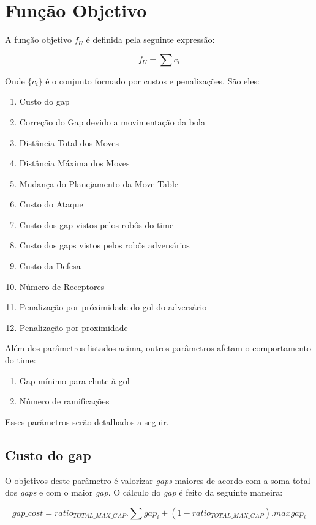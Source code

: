 \section{Função Objetivo}
A função objetivo $f_U$ é definida pela seguinte
expressão:

\begin{dmath}
  f_U = \sum c_i 
\end{dmath}

Onde $\lbrace c_i \rbrace$ é o conjunto formado
por custos e penalizações. São eles:
\begin{enumerate}
  \item Custo do gap
  \item Correção do Gap devido a movimentação da bola
  \item Distância Total dos Moves
  \item Distância Máxima dos Moves 
  \item Mudança do Planejamento da Move Table
  \item Custo do Ataque
  \item Custo dos gap vistos pelos robôs do time
  \item Custo dos gaps vistos pelos robôs adversários
  \item Custo da Defesa
  \item Número de Receptores
  \item Penalização por próximidade do gol do adversário
  \item Penalização por proximidade
\end{enumerate}

Além dos parâmetros listados acima, outros parâmetros
afetam o comportamento do time:
\begin{enumerate}
  \item Gap mínimo para chute à gol
  \item Número de ramificações
\end{enumerate}

Esses parâmetros serão detalhados a seguir.

\subsection{Custo do gap}\label{subsec:custo_gap}
O objetivos deste parâmetro é valorizar \textit{gaps} maiores
de acordo com a soma total dos \textit{gaps} e com o maior \textit{gap}.
O cálculo do \textit{gap} é feito da seguinte maneira:

\begin{dmath} 
 gap{\_}cost = ratio_{TOTAL{\_}MAX{\_}GAP} . \sum gap_i
 + (1 - ratio_{TOTAL{\_}MAX{\_}GAP}) . max{gap_i} 
\end{dmath} 

